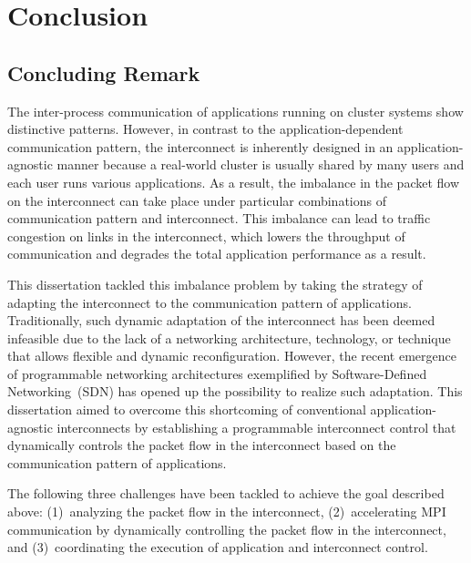 \chapter{Conclusion}\label{sec:v}

\section{Concluding Remark}
The inter-process communication of applications running on cluster systems
show distinctive patterns. However, in contrast to the application-dependent
communication pattern, the interconnect is inherently designed in an
application-agnostic manner because a real-world cluster is usually shared by
many users and each user runs various applications. As a result,
the imbalance in the packet flow on the interconnect can take place under
particular combinations of communication pattern and interconnect. This
imbalance can lead to traffic congestion on links in the interconnect, which
lowers the throughput of communication and degrades the total application
performance as a result.

This dissertation tackled this imbalance problem by taking the strategy of
adapting the interconnect to the communication pattern of applications.
Traditionally, such dynamic adaptation of the interconnect has been deemed
infeasible due to the lack of a networking architecture, technology, or
technique that allows flexible and dynamic reconfiguration. However, the
recent emergence of programmable networking architectures exemplified by
Software-Defined Networking~(SDN) has opened up the possibility to realize
such adaptation. This dissertation aimed to overcome this shortcoming of
conventional application-agnostic interconnects by establishing a programmable
interconnect control that dynamically controls the packet flow in the
interconnect based on the communication pattern of applications.

The following three challenges have been tackled to achieve the goal described
above: (1)~analyzing the packet flow in the interconnect, (2)~accelerating MPI
communication by dynamically controlling the packet flow in the interconnect,
and (3)~coordinating the execution of application and interconnect control.

